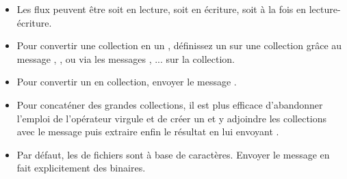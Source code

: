 \documentclass[a4paper,10pt,twoside]{book}
\begin{document}
\begin{itemize}
  \item Les flux peuvent être soit en lecture, soit en écriture, soit à la fois en lecture-écriture.
  \item Pour convertir une collection en un \stream, définissez un \stream
sur une collection grâce au message , \eg {}, ou via les messages , \etc ... sur la collection.
  \item Pour convertir un \stream en collection, envoyer le message .
  \item Pour concaténer des grandes collections, il est plus efficace d'abandonner l'emploi de l'opérateur virgule \ct{,} et de créer un \stream et y adjoindre les collections avec le message  puis extraire enfin le résultat en lui envoyant .
  \item Par défaut, les \streams de fichiers sont à base de caractères.
Envoyer le message  en fait explicitement des \streams binaires.
\end{itemize}

\ifx\wholebook\relax\else
\end{document}
